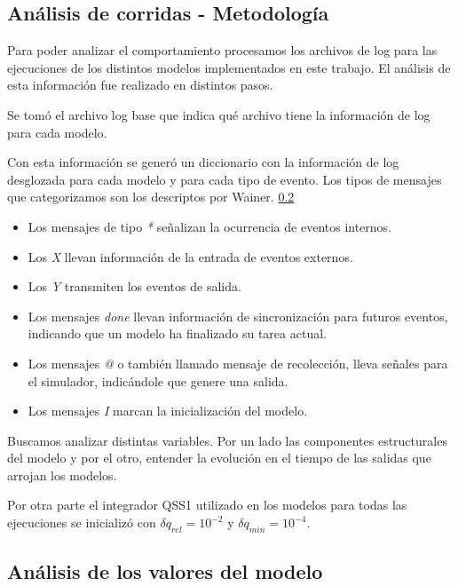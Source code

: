 
\subsection{Análisis de corridas - Metodología}

Para poder analizar el comportamiento procesamos los archivos de log para las ejecuciones de los distintos modelos implementados en este trabajo.
El análisis de esta información fue realizado en distintos pasos.

Se tomó el archivo log base que indica qué archivo tiene la información de log para cada modelo.

Con esta información se generó un diccionario con la información de log desglozada para cada modelo y para cada tipo de evento. Los tipos de mensajes que categorizamos son los descriptos por Wainer. \ref{}

\begin{itemize}
    \item Los mensajes de tipo \textit{*} señalizan la ocurrencia de eventos internos.
    \item Los \textit{X} llevan información de la entrada de eventos externos.
    \item Los \textit{Y} transmiten los eventos de salida.
    \item Los mensajes \textit{done} llevan información de sincronización para futuros eventos, indicando que un modelo ha finalizado su tarea actual.
    \item Los mensajes  \textit{@} o también llamado mensaje de recolección,
        lleva señales para el simulador, indicándole que genere una salida.
    \item Los mensajes \textit{I} marcan la inicialización del modelo.
\end{itemize}

Buscamos analizar distintas variables. Por un lado las componentes
estructurales del modelo y por el otro, entender la evolución en el tiempo de
las salidas que arrojan los modelos.


Por otra parte el integrador QSS1 utilizado en los modelos para todas las ejecuciones se inicializó con $\delta q_{rel} = 10^{-2}$ y $\delta q_{min} = 10^{-4}$.

\subsection{Análisis de los valores del modelo}

